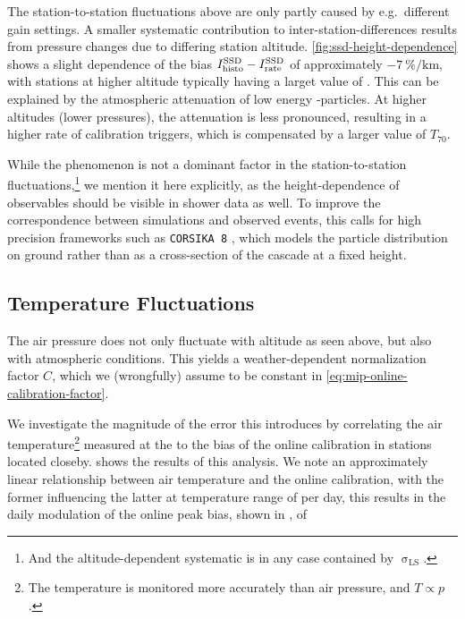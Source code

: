 The station-to-station fluctuations above are only partly caused by 
e.g.~different gain settings. A smaller systematic contribution to 
inter-station-differences results from pressure changes due to differing station
altitude. \cref{fig:ssd-height-dependence} shows a slight dependence of the bias
$I^\text{SSD}_\text{histo} - I^\text{SSD}_\text{rate}$ of approximately $\SI{-7}{\percent\per\kilo\meter}$, 
with stations at higher altitude typically having a larget value of \MipOnline. 
This can be explained by the atmospheric attenuation of low energy 
\EM-particles. At higher altitudes (lower pressures), the attenuation is less 
pronounced, resulting in a higher rate of calibration triggers, which is 
compensated by a larger value of $T_{70}$.

While the phenomenon is not a dominant factor in the station-to-station 
fluctuations,\footnote{And the altitude-dependent systematic is in any case 
contained by $\upsigma_\mathrm{LS}$.} we mention it here explicitly, as the 
height-dependence of \SSD observables should be visible in shower data as well.
To improve the correspondence between \EAS simulations and observed \SSD events,
this calls for high precision frameworks such as \texttt{CORSIKA 8} 
\cite{engelNextGenerationCORSIKA2019}, which models the particle distribution on
ground rather than as a cross-section of the cascade at a fixed height.

\subsection{Temperature Fluctuations}

The air pressure does not only fluctuate with altitude as seen above, but also
with atmospheric conditions. This yields a weather-dependent normalization
factor $C$, which we (wrongfully) assume to be constant in 
\cref{eq:mip-online-calibration-factor}. 

We investigate the magnitude of the error this introduces by correlating the 
air temperature\footnote{The temperature is monitored more accurately than air
pressure, and $T\propto p$.} measured at the \CRS to the bias of the \SSD online
calibration in  stations located closeby.  
shows the results of this analysis. We note an approximately linear 
relationship between air temperature and the online calibration, with the 
former influencing the latter at 
temperature range of  per day, this results in the daily 
modulation of the online \MIP peak bias, shown in , of 

